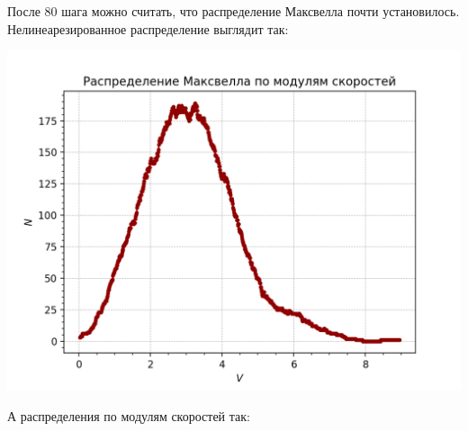 \newpage

После 80 шага можно считать, что распределение Максвелла почти установилось. Нелинеарезированное распределение выглядит так:

\begin{center}
        \includegraphics[width=0.6\linewidth]{Maxwell.png}\\
\end{center}

А распределения по модулям скоростей так:\\



